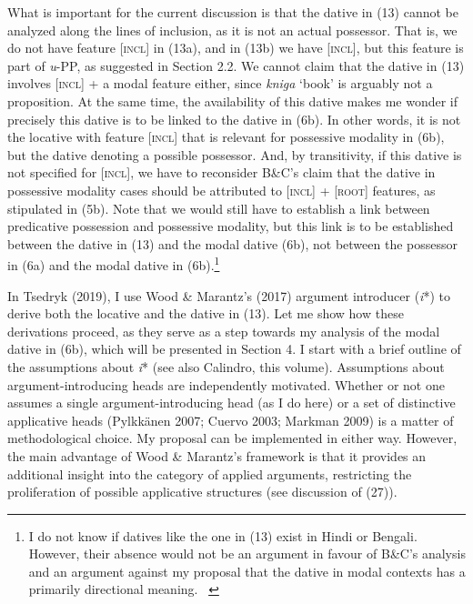 \documentclass[12pt]{article}
\newenvironment{styleStandard}{\setlength\leftskip{0cm}\setlength\rightskip{0cm plus 1fil}\setlength\parindent{0cm}\setlength\parfillskip{0pt plus 1fil}\setlength\parskip{0in plus 1pt}\writerlistparindent\writerlistleftskip\leavevmode\normalfont\normalsize\writerlistlabel\ignorespaces}{\unskip\vspace{0.111in plus 0.0111in}\par}
\newcommand\writerlistleftskip{}
\newcommand\writerlistparindent{}
\newcommand\writerlistlabel{}
\begin{document}
\begin{styleStandard}
What is important for the current discussion is that the dative in (13) cannot be analyzed along the lines of inclusion, as it is not an actual possessor. That is, we do not have feature [\textsc{incl}] in (13a), and in (13b) we have [\textsc{incl}], but this feature is part of \textit{u}{}-PP, as suggested in Section 2.2. We cannot claim that the dative in (13) involves [\textsc{incl}] + a modal feature either, since \textit{kniga} ‘book’ is arguably not a proposition. At the same time, the availability of this dative makes me wonder if precisely this dative is to be linked to the dative in (6b). In other words, it is not the locative with feature [\textsc{incl}] that is relevant for possessive modality in (6b), but the dative denoting a possible possessor. And, by transitivity, if this dative is not specified for [\textsc{incl}], we have to reconsider B\&C’s claim that the dative in possessive modality cases should be attributed to [\textsc{incl}] + [\textsc{root}] features, as stipulated in (5b). Note that we would still have to establish a link between predicative possession and possessive modality, but this link is to be established between the dative in (13) and the modal dative (6b), not between the possessor in (6a) and the modal dative in (6b).\footnote{ I do not know if datives like the one in (13) exist in Hindi or Bengali. However, their absence would not be an argument in favour of B\&C’s analysis and an argument against my proposal that the dative in modal contexts has a primarily directional meaning. \ } \ 
\end{styleStandard}

\begin{styleStandard}
In Tsedryk (2019), I use Wood \& Marantz’s (2017) argument introducer (\textit{i}*) to derive both the locative and the dative in (13). Let me show how these derivations proceed, as they serve as a step towards my analysis of the modal dative in (6b), which will be presented in Section 4. I start with a brief outline of the assumptions about \textit{i}* (see also Calindro, this volume). Assumptions about argument-introducing heads are independently motivated. Whether or not one assumes a single argument-introducing head (as I do here) or a set of distinctive applicative heads (Pylkkänen 2007; Cuervo 2003; Markman 2009) is a matter of methodological choice. My proposal can be implemented in either way. However, the main advantage of Wood \& Marantz’s framework is that it provides an additional insight into the category of applied arguments, restricting the proliferation of possible applicative structures (see discussion of (27)). \ \ \ \ \ \ 
\end{styleStandard}
\end{document}
